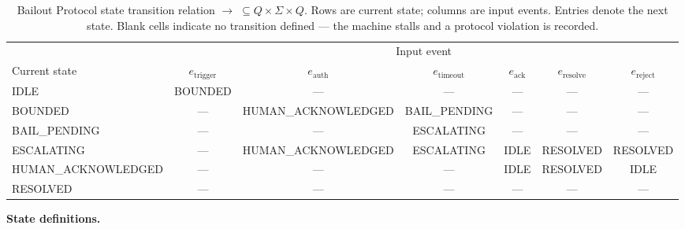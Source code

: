 \begin{table}[htbp]
\centering
\caption{Bailout Protocol state transition relation $\rightarrow \;\subseteq Q \times \Sigma \times Q$. Rows are current state; columns are input events. Entries denote the next state. Blank cells indicate no transition defined --- the machine stalls and a protocol violation is recorded.}
\label{tab:bailout-transitions}
\begin{tabular}{@{}lcccccc@{}}
\toprule
 & \multicolumn{6}{c}{Input event} \\
\cmidrule(l){2-7}
Current state & $e_{\text{trigger}}$ & $e_{\text{auth}}$ & $e_{\text{timeout}}$ & $e_{\text{ack}}$ & $e_{\text{resolve}}$ & $e_{\text{reject}}$ \\
\midrule
IDLE                  & BOUNDED               & --- & --- & --- & --- & --- \\
BOUNDED               & --- & HUMAN\_ACKNOWLEDGED & BAIL\_PENDING & --- & --- & --- \\
BAIL\_PENDING         & --- & --- & ESCALATING & --- & --- & --- \\
ESCALATING            & --- & HUMAN\_ACKNOWLEDGED & ESCALATING & IDLE & RESOLVED & RESOLVED \\
HUMAN\_ACKNOWLEDGED   & --- & --- & --- & IDLE & RESOLVED & IDLE \\
RESOLVED              & --- & --- & --- & --- & --- & --- \\
\bottomrule
\end{tabular}
\end{table}

\bigskip
\noindent\textbf{State definitions.}

